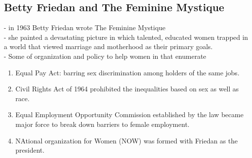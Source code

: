 \documentclass{article}
\begin{document}
\subsection{Betty Friedan and The Feminine Mystique}
- in 1963 Betty Friedan wrote The Feminine Mystique\\
- she painted a devastating picture in which talented, educated women trapped in a world that viewed marriage and motherhood as their primary goals.\\
- Some of organization and policy to help women in that enumerate
\begin{enumerate}
	\item Equal Pay Act: barring sex discrimination among holders of the same jobs.
	\item Civil Rights Act of 1964 prohibited the inequalities based on sex as well as race.
	\item Equal Employment Opportunity Commission established by the law became major force to break down barriers to female employment.
	\item NAtional organization for Women (NOW) was formed with Friedan as the president.
\end{enumerate}
\end{document}
